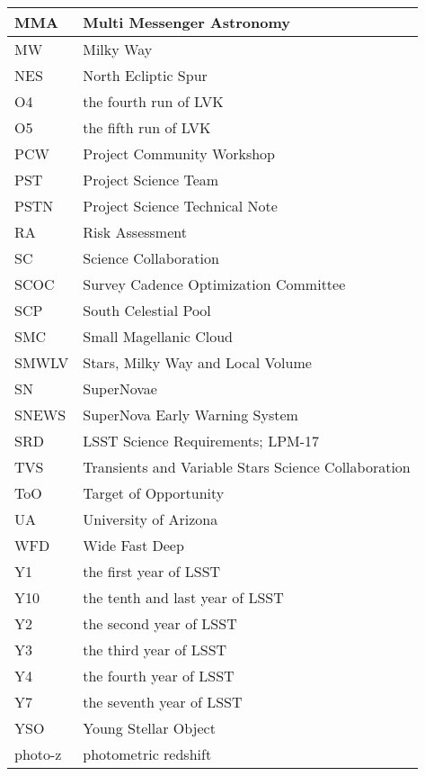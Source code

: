 \begin{longtable}{p{}p{}}
MMA & Multi Messenger Astronomy \\\hline
MW & Milky Way \\\hline
NES & North Ecliptic Spur \\\hline
O4 & the fourth run of LVK \\\hline
O5 & the fifth run of LVK \\\hline
PCW & Project Community Workshop \\\hline
PST & Project Science Team \\\hline
PSTN & Project Science Technical Note \\\hline
RA & Risk Assessment \\\hline
SC & Science Collaboration \\\hline
SCOC & Survey Cadence Optimization Committee \\\hline
SCP & South Celestial Pool \\\hline
SMC & Small Magellanic Cloud \\\hline
SMWLV & Stars, Milky Way and Local Volume \\\hline
SN & SuperNovae \\\hline
SNEWS & SuperNova Early Warning System \\\hline
SRD & LSST Science Requirements; LPM-17 \\\hline
TVS & Transients and Variable Stars Science Collaboration \\\hline
ToO & Target of Opportunity \\\hline
UA & University of Arizona \\\hline
WFD & Wide Fast Deep \\\hline
Y1 & the first year of LSST \\\hline
Y10 & the tenth and last year of LSST \\\hline
Y2 & the second year of LSST \\\hline
Y3 & the third  year of LSST \\\hline
Y4 & the fourth year of LSST \\\hline
Y7 & the seventh year of LSST \\\hline
YSO & Young Stellar Object \\\hline
photo-z & photometric redshift \\\hline
\end{longtable}
